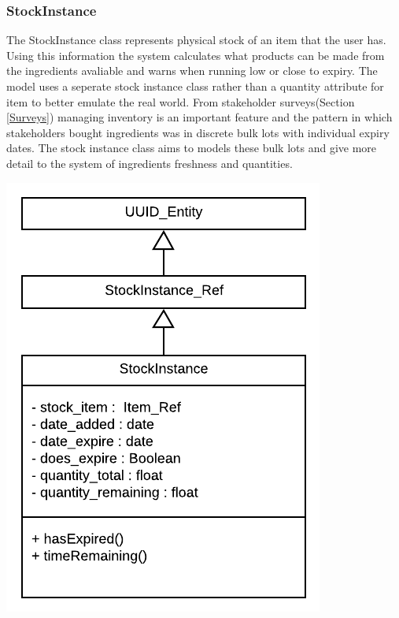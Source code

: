 \subsubsection{StockInstance}
	\begin{minipage}[t]{.6\linewidth}
		The StockInstance class represents physical stock of an item that the user has. Using this information the system calculates what products can be made from the ingredients avaliable and warns when running low or close to expiry. The model uses a seperate stock instance class rather than a quantity attribute for item to better emulate the real world. From stakeholder surveys(Section \ref{Surveys}) managing inventory is an important feature and the pattern in which stakeholders bought ingredients was in discrete bulk lots with individual expiry dates. The stock instance class aims to models these bulk lots and give more detail to the system of  ingredients freshness and quantities.
		
	\end{minipage}
	\hspace{0.02\linewidth}
	\begin{minipage}[t][][b]{.3\linewidth}
		\includegraphics[width=\linewidth]{images/data_model/stock.png}
	\end{minipage}

